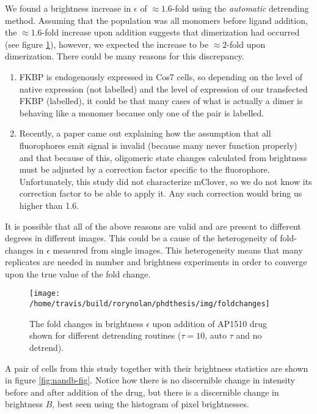 \documentclass[12pt,]{book}
\providecommand{\tightlist}{%
  \setlength{\itemsep}{0pt}\setlength{\parskip}{0pt}}
\theoremstyle{definition}
\theoremstyle{definition}
\theoremstyle{definition}
\theoremstyle{remark}
\begin{document}
We found a brightness increase in \(\epsilon\) of \(\approx 1.6\)-fold
using the \emph{automatic} detrending method. Assuming that the
population was all monomers before ligand addition, the
\(\approx 1.6\)-fold increase upon addition suggests that dimerization
had occurred (see figure \ref{fig:FKBPfoldchanges}), however, we
expected the increase to be \(\approx 2\)-fold upon dimerization. There
could be many reasons for this discrepancy.

\begin{enumerate}
\def\labelenumi{\arabic{enumi}.}
\tightlist
\item
  FKBP is endogenously expressed in Cos7 cells, so depending on the
  level of native expression (not labelled) and the level of expression
  of our transfected FKBP (labelled), it could be that many cases of
  what is actually a dimer is behaving like a monomer because only one
  of the pair is labelled.
\item
  Recently, a paper came out \citep{fpcompare} explaining how the
  assumption that all fluorophores emit signal is invalid (because many
  never function properly) and that because of this, oligomeric state
  changes calculated from brightness must be adjusted by a correction
  factor specific to the fluorophore. Unfortunately, this study did not
  characterize mClover, so we do not know its correction factor to be
  able to apply it. Any such correction would bring us higher than 1.6.
\end{enumerate}

It is possible that all of the above reasons are valid and are present
to different degrees in different images. This could be a cause of the
heterogeneity of fold-changes in \(\epsilon\) measured from single
images. This heterogeneity means that many replicates are needed in
number and brightness experiments in order to converge upon the true
value of the fold change.





\begin{figure}

\texttt{[image: /home/travis/build/rorynolan/phdthesis/img/foldchanges]} \hfill{}

\caption{The fold changes in brightness
\(\epsilon\) upon addition of AP1510 drug shown for different detrending
routines (\(\tau=10\), auto \(\tau\) and no detrend).}\label{fig:FKBPfoldchanges}
\end{figure}

A pair of cells from this study together with their brightness
statistics are shown in figure \ref{fig:nandb-fig}. Notice how there is
no discernible change in intensity before and after addition of the
drug, but there is a discernible change in brightness \(B\), best seen
using the histogram of pixel brightnesses.
\end{document}
